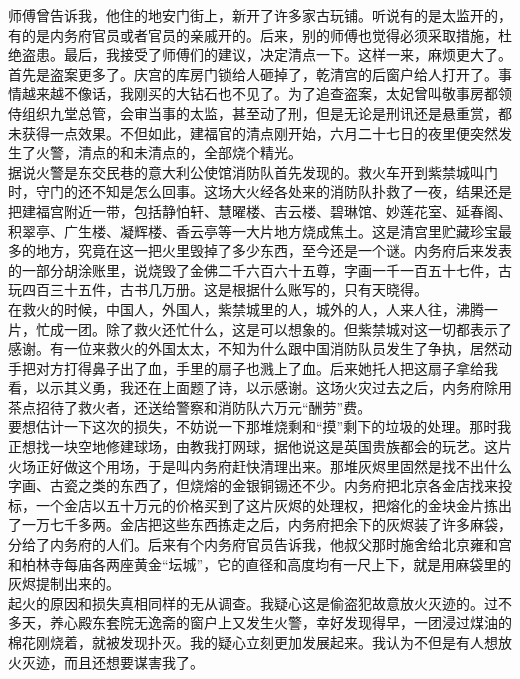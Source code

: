 师傅曾告诉我，他住的地安门街上，新开了许多家古玩铺。听说有的是太监开的，有的是内务府官员或者官员的亲戚开的。后来，别的师傅也觉得必须采取措施，杜绝盗患。最后，我接受了师傅们的建议，决定清点一下。这样一来，麻烦更大了。\\

首先是盗案更多了。庆宫的库房门锁给人砸掉了，乾清宫的后窗户给人打开了。事情越来越不像话，我刚买的大钻石也不见了。为了追查盗案，太妃曾叫敬事房都领侍组织九堂总管，会审当事的太监，甚至动了刑，但是无论是刑讯还是悬重赏，都未获得一点效果。不但如此，建福官的清点刚开始，六月二十七日的夜里便突然发生了火警，清点的和未清点的，全部烧个精光。\\

据说火警是东交民巷的意大利公使馆消防队首先发现的。救火车开到紫禁城叫门时，守门的还不知是怎么回事。这场大火经各处来的消防队扑救了一夜，结果还是把建福宫附近一带，包括静怕轩、慧曜楼、吉云楼、碧琳馆、妙莲花室、延春阁、积翠亭、广生楼、凝辉楼、香云亭等一大片地方烧成焦土。这是清宫里贮藏珍宝最多的地方，究竟在这一把火里毁掉了多少东西，至今还是一个谜。内务府后来发表的一部分胡涂账里，说烧毁了金佛二千六百六十五尊，字画一千一百五十七件，古玩四百三十五件，古书几万册。这是根据什么账写的，只有天晓得。\\

在救火的时候，中国人，外国人，紫禁城里的人，城外的人，人来人往，沸腾一片，忙成一团。除了救火还忙什么，这是可以想象的。但紫禁城对这一切都表示了感谢。有一位来救火的外国太太，不知为什么跟中国消防队员发生了争执，居然动手把对方打得鼻子出了血，手里的扇子也溅上了血。后来她托人把这扇子拿给我看，以示其义勇，我还在上面题了诗，以示感谢。这场火灾过去之后，内务府除用茶点招待了救火者，还送给警察和消防队六万元“酬劳”费。\\

要想估计一下这次的损失，不妨说一下那堆烧剩和“摸”剩下的垃圾的处理。那时我正想找一块空地修建球场，由教我打网球，据他说这是英国贵族都会的玩艺。这片火场正好做这个用场，于是叫内务府赶快清理出来。那堆灰烬里固然是找不出什么字画、古瓷之类的东西了，但烧熔的金银铜锡还不少。内务府把北京各金店找来投标，一个金店以五十万元的价格买到了这片灰烬的处理权，把熔化的金块金片拣出了一万七千多两。金店把这些东西拣走之后，内务府把余下的灰烬装了许多麻袋，分给了内务府的人们。后来有个内务府官员告诉我，他叔父那时施舍给北京雍和宫和柏林寺每庙各两座黄金“坛城”，它的直径和高度均有一尺上下，就是用麻袋里的灰烬提制出来的。\\

起火的原因和损失真相同样的无从调查。我疑心这是偷盗犯故意放火灭迹的。过不多天，养心殿东套院无逸斋的窗户上又发生火警，幸好发现得早，一团浸过煤油的棉花刚烧着，就被发现扑灭。我的疑心立刻更加发展起来。我认为不但是有人想放火灭迹，而且还想要谋害我了。\\

